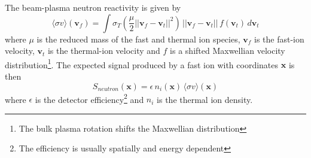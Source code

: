 The beam-plasma neutron reactivity is given by
\begin{equation}
    \langle \sigma v \rangle(\mathbf{v}_f) = \int \sigma_T(\frac{\mu}{2}||\mathbf{v}_f - \mathbf{v}_t||^2)\, ||\mathbf{v}_f - \mathbf{v}_t||\, f(\mathbf{v}_t)\, d\mathbf{v}_t
\end{equation}
where $\mu$ is the reduced mass of the fast and thermal ion species, $\mathbf{v}_f$ is the fast-ion velocity, $\mathbf{v}_t$ is the thermal-ion velocity and $f$ is a shifted Maxwellian velocity distribution\footnote{The bulk plasma rotation shifts the Maxwellian distribution}.
The expected signal produced by a fast ion with coordinates $\mathbf{x}$ is then 
\begin{equation}\label{eq:W_neutron}
    S_{neutron}(\mathbf{x}) = \epsilon \, n_i(\mathbf{x})\,\langle \sigma v \rangle (\mathbf{x}) 
\end{equation}
where $\epsilon$ is the detector efficiency\footnote{The efficiency is usually spatially and energy dependent} and $n_i$ is the thermal ion density.